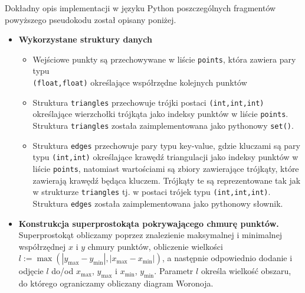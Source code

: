 \documentclass{myclass}
\begin{document}
Dokładny opis implementacji w języku Python poszczególnych fragmentów powyższego
pseudokodu został opisany poniżej.
\begin{itemize}
    \item \textbf{Wykorzystane struktury danych}
    \begin{itemize}
        \item Wejściowe punkty są przechowywane w liście \texttt{points}, która
        zawiera pary typu \\\texttt{(float,float)} określające współrzędne
        kolejnych punktów
        
        \item Struktura \texttt{triangles} przechowuje trójki postaci
        \texttt{(int,int,int)} określające wierzchołki trójkąta jako indeksy
        punktów w liście \texttt{points}. Struktura \texttt{triangles} została
        zaimplementowana jako pythonowy \texttt{set()}.
        
        \item Struktura \texttt{edges} przechowuje pary typu key-value, gdzie
        kluczami są pary typu \texttt{(int,int)} określające krawędź
        triangulacji jako indeksy punktów w liście \texttt{points}, natomiast
        wartościami są zbiory zawierające trójkąty, które zawierają krawędź
        będąca kluczem. Trójkąty te są reprezentowane tak jak w strukturze
        \texttt{triangles} tj. w postaci trójek typu \texttt{(int,int,int)}.
        Struktura \texttt{edges} została zaimplementowana jako pythonowy
        słownik.
    \end{itemize}

    \item \textbf{Konstrukcja superprostokąta pokrywającego chmurę punktów.}
    Superprostokąt obliczamy poprzez znalezienie maksymalnej i minimalnej
    współrzędnej \(x\) i \(y\) chmury punktów, obliczenie wielkości
    \(l:=\max(|y_\text{max}-y_\text{min}|, |x_\text{max}-x_\text{min}|)\), a
    następnie odpowiednio dodanie i odjęcie \(l\) do/od \(x_\text{max}\),
    \(y_\text{max}\) i \(x_\text{min}\), \(y_\text{min}\). Parametr \(l\)
    określa wielkość obszaru, do którego ograniczamy obliczany diagram Woronoja.


\end{itemize}
\end{document}
